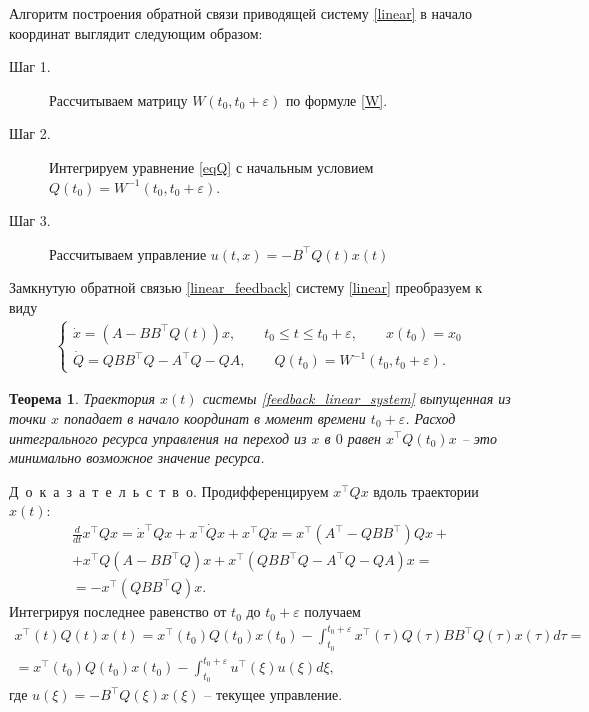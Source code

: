\documentclass[12pt,a4paper,twoside]{article}  %
\newtheorem{teo}{Теорема}
\newcommand{\doc}{\mbox{Д о к а з а т е л ь с т в о}}
\begin{document}
Алгоритм построения обратной связи приводящей систему \eqref{linear} в начало координат выглядит следующим образом:
\begin{description}
	\item[Шаг 1.] Рассчитываем матрицу $ W(t_0,t_0+\varepsilon) $ по формуле \eqref{W}.
	\item[Шаг 2.] Интегрируем уравнение \eqref{eqQ} с начальным условием $ Q(t_0)  = W^{-1}(t_0,t_0+\varepsilon)$.
	\item[Шаг 3.] Рассчитываем управление $ u(t,x) = -B^{\top} Q(t) x(t)$
\end{description}
Замкнутую обратной связью \eqref{linear_feedback} систему \eqref{linear} преобразуем к виду
\begin{gather}\label{feedback_linear_system}
	\left\lbrace \begin{array}{l}
			\dot{x} = (A - B B^{\top} Q(t) ) x, \qquad t_0 \leqslant t \leqslant t_0 + \varepsilon, \qquad x(t_0) = x_0\\
			\dot{Q} = Q B B^{\top} Q - A^{\top}Q - Q A, \qquad Q(t_0) = W^{-1}(t_0,t_0+\varepsilon).
		\end{array} \right. 
	\end{gather}
\begin{teo}\label{linear_teo}
	Траектория $x(t) $ системы \eqref{feedback_linear_system} выпущенная из точки $ x $ попадает в начало координат в момент времени $ t_0 + \varepsilon$. Расход интегрального ресурса управления на переход из $ x $ в $ 0 $ равен $x^{\top} Q(t_0) x $ -- это минимально возможное значение ресурса.
\end{teo}
\doc. 
	Продифференцируем $x^{\top} Q x$ вдоль траектории $ x(t) $:
	\begin{gather*}
		\frac{d}{dt} x^{\top} Q x = \dot{x}^{\top} Q x + x^{\top} \dot{Q} x + x^{\top} Q \dot{x} = x^{\top} (A^{\top} - Q B B^{\top} )Q x + \\ + x^{\top} Q (A - B B^{\top} Q)x + x^{\top} (Q B B^{\top} Q - A^{\top}Q - Q A) x = \\ = 
		-x^{\top} (Q B B^{\top} Q) x.
	\end{gather*}
	Интегрируя последнее равенство от $ t_0 $ до $ t_0 + \varepsilon $ получаем
	\begin{gather}\label{xqx}
		x^{\top}(t) Q(t)x(t) = x^{\top}(t_0) Q(t_0)x(t_0) - \int_{t_0}^{t_0 + \varepsilon} x^{\top}(\tau) Q(\tau) B B^{\top} Q(\tau) x(\tau) d\tau= \\ = 
		x^{\top}(t_0) Q(t_0)x(t_0) - \int_{t_0}^{t_0 + \varepsilon} u^{\top}(\xi)  u(\xi) d\xi,
	\end{gather}
где $ u(\xi) = -B^{\top} Q(\xi) x(\xi)$ -- текущее управление.
\end{document}

